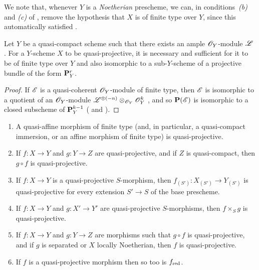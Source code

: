 We note that, whenever $Y$ is a \emph{Noetherian} prescheme, we can, in conditions~\emph{(b)} and \emph{(c)} of , remove the hypothesis that $X$ is of finite type over $Y$, since this automatically satisfied .

\begin{cor}[5.3.3]
\label{2.5.3.3}
Let $Y$ be a quasi-compact scheme such that there exists an ample $\mathscr{O}_Y$-module $\mathscr{L}$ .
For a $Y$-scheme $X$ to be quasi-projective, it is necessary and sufficient for it to be of finite type over $Y$ and also isomorphic to a sub-$Y$-scheme of a projective bundle of the form $\mathbf{P}_Y^r$.
\end{cor}

\begin{proof}
\label{proof-2.5.3.3}
If $\mathscr{E}$ is a quasi-coherent $\mathscr{O}_Y$-module of finite type, then $\mathscr{E}$ is isomorphic to a quotient of an $\mathscr{O}_Y$-module $\mathscr{L}^{\otimes(-n)}\otimes_{\mathscr{O}_Y}\mathscr{O}_Y^k$ , and so $\mathbf{P}(\mathscr{E})$ is isomorphic to a closed subscheme of $\mathbf{P}_Y^{k-1}$ ( and ).
\end{proof}

\begin{prop}[5.3.4]
\label{2.5.3.4}
\medskip\noindent
\begin{enumerate}[label=\emph{(\roman*)}]
    \item A quasi-affine morphism of finite type (and, in particular, a quasi-compact immersion, or an affine morphism of finite type) is quasi-projective.
    \item If $f:X\to Y$ and $g:Y\to Z$ are quasi-projective, and if $Z$ is quasi-compact, then $g\circ f$ is quasi-projective.
    \item If $f:X\to Y$ is a quasi-projective $S$-morphism, then $f_{(S')}:X_{(S')}\to Y_{(S')}$ is quasi-projective for every extension $S'\to S$ of the base prescheme.
    \item If $f:X\to Y$ and $g:X'\to Y'$ are quasi-projective $S$-morphisms, then $f\times_S g$ is quasi-projective.
    \item If $f:X\to Y$ and $g:Y\to Z$ are morphisms such that $g\circ f$ is quasi-projective, and if $g$ is separated or $X$ locally Noetherian, then $f$ is quasi-projective.
    \item If $f$ is a quasi-projective morphism then so too is $f_{\mathrm{red}}$.
\end{enumerate}
\end{prop}

